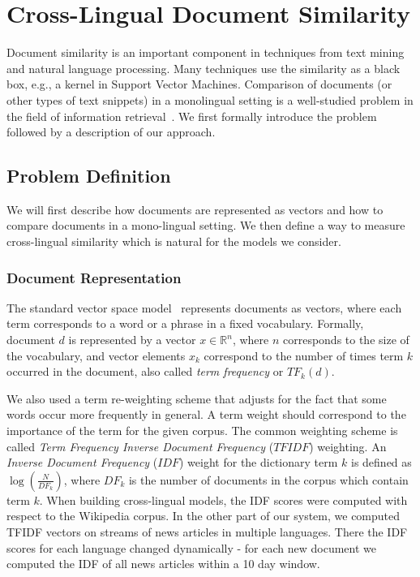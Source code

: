 \documentclass[twoside,11pt]{article}
\newcommand{\RR}{\mathbb{R}}
\begin{document}
\section{Cross-Lingual Document Similarity}
\label{sec:crosslingual}
Document similarity is an important component in techniques from text mining and natural language processing. Many techniques use the similarity as a black box, e.g., a kernel in Support Vector Machines. Comparison of documents (or other types of text snippets) in a monolingual setting is a well-studied problem in the field of information retrieval~\cite{Salton88term-weightingapproaches}. We first formally introduce the problem followed by a description of  our approach.

\subsection{Problem Definition}\label{sec:tfidf}
We will first describe how documents are represented as vectors and how to compare documents in a mono-lingual setting. We then define a way to measure cross-lingual similarity which is natural for the models we consider.

\subsubsection{Document Representation}
The standard vector space model~\cite{Salton88term-weightingapproaches} represents documents as vectors, where each term corresponds to a word or a phrase in a fixed vocabulary. Formally, document $d$ is represented by a vector $x \in \RR^n$, where $n$ corresponds to the size of the vocabulary, and vector elements $x_k$ correspond to the number of times term $k$ occurred in the document, also called \emph{term frequency} or $TF_k(d)$.

We also used a term re-weighting scheme that adjusts for the fact that some words occur more frequently in general. A term weight should correspond to the importance of the term for the given corpus. The common weighting scheme is called \emph{Term Frequency Inverse Document Frequency} ($TFIDF$) weighting. An \emph{Inverse Document Frequency} ($IDF$) weight for the dictionary term $k$ is defined as $\log\left( \frac{N}{DF_k} \right)$, where $DF_k$ is the number of documents in the corpus which contain term $k$.
When building cross-lingual models, the IDF scores were computed with respect to the Wikipedia corpus. In the other part of our system, we computed TFIDF vectors on streams of news articles in multiple languages. There the IDF scores for each language changed dynamically - for each new document we computed the IDF of all news articles within a 10 day window.
\end{document}
